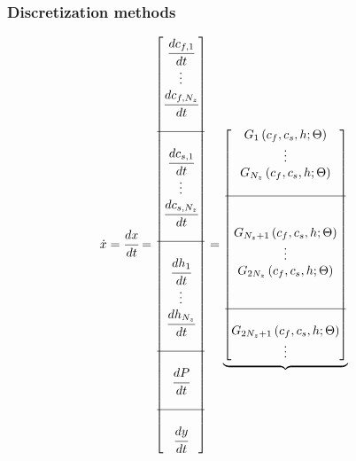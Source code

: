 \documentclass[a4paper,fleqn]{cas-dc}
\begin{document}
	\subsubsection{Discretization methods}
	
	\begin{figure}[!h]
		\centering
		{\footnotesize
			\begin{align*}
				\dot{x} &= \cfrac{d x}{d t} = 
				\begin{bmatrix}
					\cfrac{d c_{f,1}}{d t} 	  \\
					\vdots					  \\
					\cfrac{d c_{f,N_z}}{d t} \\
					\\ \hline \\
					\cfrac{d c_{s,1}}{d t} 	  \\
					\vdots					  \\
					\cfrac{d c_{s,N_z}}{d t} \\
					\\ \hline \\
					\cfrac{d h_1}{d t} 	  \\
					\vdots 					  \\
					\cfrac{d h_{N_z}}{d t} \\
					\\ \hline \\
					\cfrac{d P}{d t} \\
					\\ \hline \\
					\cfrac{d y}{d t}
				\end{bmatrix}
				=
				\underbrace{\begin{bmatrix}
						G_1 \left( c_f,c_s,h; \Theta \right)\\ 
						\vdots\\ 
						G_{N_z} \left( c_f,c_s,h; \Theta \right)\\ 
						\\ \hline \\ \\
						G_{N_z+1} \left( c_f,c_s,h; \Theta \right)\\ 
						\vdots\\
						G_{2N_z} \left( c_f,c_s,h; \Theta \right)\\ 
						\\ \\ \hline \\ 
						G_{2N_z+1} \left( c_f,c_s,h; \Theta \right) \\
						\vdots\\

\end{bmatrix}}
\end{align*}}
\end{figure}
\end{document}
